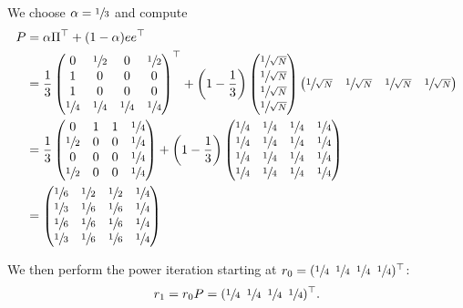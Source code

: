 We choose $\alpha=\sfrac{1}{3}$ and compute
\begin{align*}
  P &=  \alpha\Pi^\top + (1-\alpha) ee^\top \\
    &=
        \frac{1}{3}
        \begin{pmatrix}
          0&\sfrac{1}{2}&0&\sfrac{1}{2}\\
          1&0&0&0\\
          1&0&0&0\\
          \sfrac{1}{4}&\sfrac{1}{4}&\sfrac{1}{4}&\sfrac{1}{4}
        \end{pmatrix}^\top
        +
        \left(1-\frac{1}{3}\right)
          \begin{pmatrix}
            \sfrac{1}{\sqrt N}\\ \sfrac{1}{\sqrt N}\\
            \sfrac{1}{\sqrt N}\\ \sfrac{1}{\sqrt N}
          \end{pmatrix}
          \begin{pmatrix}
            \sfrac{1}{\sqrt N}&\sfrac{1}{\sqrt N}&
            \sfrac{1}{\sqrt N}&\sfrac{1}{\sqrt N}
          \end{pmatrix} \\
    &=
        \frac{1}{3}
        \begin{pmatrix}0&1&1&\sfrac{1}{4}\\ \sfrac{1}{2}&0&0&\sfrac{1}{4}\\ 0&0&0&\sfrac{1}{4}\\ \sfrac{1}{2}&0&0&\sfrac{1}{4}\end{pmatrix}
        +
        \left(1-\frac{1}{3}\right)
        \begin{pmatrix}
          \sfrac{1}{4}&\sfrac{1}{4}&\sfrac{1}{4}&\sfrac{1}{4}\\
          \sfrac{1}{4}&\sfrac{1}{4}&\sfrac{1}{4}&\sfrac{1}{4}\\
          \sfrac{1}{4}&\sfrac{1}{4}&\sfrac{1}{4}&\sfrac{1}{4}\\
          \sfrac{1}{4}&\sfrac{1}{4}&\sfrac{1}{4}&\sfrac{1}{4}
        \end{pmatrix} \\
    &=
        \begin{pmatrix}
          \sfrac{1}{6}&\sfrac{1}{2}&\sfrac{1}{2}&\sfrac{1}{4}\\
          \sfrac{1}{3}&\sfrac{1}{6}&\sfrac{1}{6}&\sfrac{1}{4}\\
          \sfrac{1}{6}&\sfrac{1}{6}&\sfrac{1}{6}&\sfrac{1}{4}\\
          \sfrac{1}{3}&\sfrac{1}{6}&\sfrac{1}{6}&\sfrac{1}{4}
        \end{pmatrix}
\end{align*}

We then perform the power iteration starting at $r_0 =
(\sfrac{1}{4}\enskip\sfrac{1}{4}\enskip\sfrac{1}{4}\enskip\sfrac{1}{4})^\top$:
%
$$r_1 = r_0 P = (\sfrac{1}{4} \enskip \sfrac{1}{4} \enskip \sfrac{1}{4} \enskip
  \sfrac{1}{4})^\top.$$